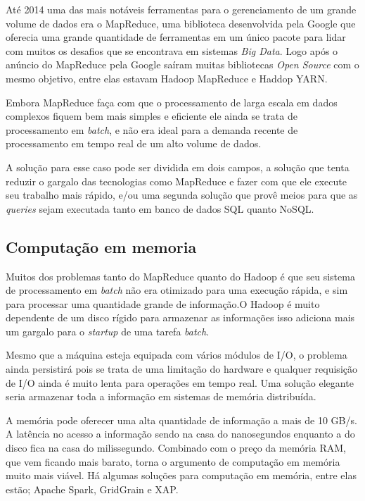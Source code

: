 Até 2014 uma das mais notáveis ferramentas para o gerenciamento de um grande volume de dados era o MapReduce, uma biblioteca desenvolvida pela Google que oferecia uma grande quantidade de ferramentas em um único pacote para lidar com muitos os desafios que se encontrava em sistemas \textit{Big Data}. Logo após o anúncio do MapReduce pela Google saíram muitas bibliotecas \textit{Open Source} com o mesmo objetivo, entre elas estavam  Hadoop MapReduce e Haddop YARN.

Embora MapReduce faça com que o processamento de larga escala em dados complexos fiquem bem mais simples e eficiente ele ainda se trata de processamento em \textit{batch}, e não era ideal para a demanda recente de processamento em tempo real de um alto volume de dados.

A solução para esse caso pode ser dividida em dois campos, a solução que tenta reduzir o gargalo das tecnologias como MapReduce e fazer com que ele execute seu trabalho mais rápido, e/ou uma segunda solução que provê meios para que as \textit{queries} sejam executada tanto em banco de dados SQL quanto NoSQL.~\cite{realtime}

\subsection{Computação em memoria}

Muitos dos problemas tanto do MapReduce quanto do Hadoop é que seu sistema de processamento em \textit{batch} não era otimizado para uma execução rápida, e sim para processar uma quantidade grande de informação.O Hadoop é muito dependente de um disco rígido para armazenar as informações isso adiciona mais um gargalo para o \textit{startup} de uma tarefa \textit{batch}.

Mesmo que a máquina esteja equipada com vários módulos de I/O, o problema ainda persistirá pois se trata de uma limitação do hardware e qualquer requisição de I/O ainda é muito lenta para operações em tempo real. Uma solução elegante seria armazenar toda a informação em sistemas de memória distribuída.

A memória pode oferecer uma alta quantidade de informação a mais de 10 GB/s. A latência no acesso a informação sendo na casa do nanosegundos enquanto a do disco fica na casa do milissegundo. Combinado com o preço da memória RAM, que vem ficando mais barato, torna o argumento de computação em memória muito mais viável. Há algumas soluções para computação em memória, entre elas estão; Apache Spark, GridGrain e XAP.

